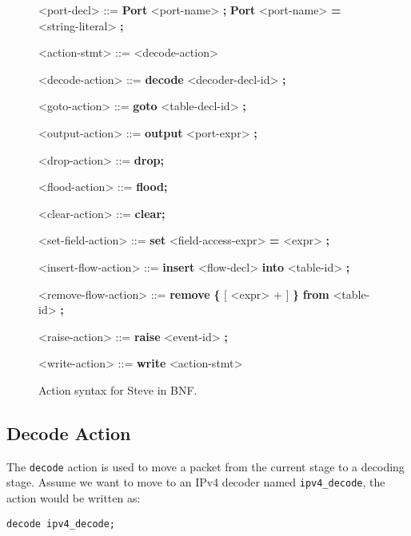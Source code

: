 \begin{figure}
\begin{mdframed}
\begin{grammar}
<port-decl> ::=
\textbf{Port} <port-name> \textbf{;}
\alt \textbf{Port} <port-name> \textbf{=} <string-literal> \textbf{;}

<action-stmt> ::=
<decode-action>

<decode-action> ::=
\textbf{decode} <decoder-decl-id> \textbf{;}

<goto-action> ::=
\textbf{goto} <table-decl-id> \textbf{;}

<output-action> ::=
\textbf{output} <port-expr> \textbf{;}

<drop-action> ::= \textbf{drop;}

<flood-action> ::= \textbf{flood;}

<clear-action> ::= \textbf{clear;}

<set-field-action> ::= \textbf{set} <field-access-expr> \textbf{=} <expr> \textbf{;}

<insert-flow-action> ::= \textbf{insert} <flow-decl> \textbf{into} <table-id> \textbf{;}

<remove-flow-action> ::= \textbf{remove} \textbf{\{} [ <expr> + ] \textbf{\}}
\textbf{from} <table-id> \textbf{;}

<raise-action> ::= \textbf{raise} <event-id> \textbf{;}

<write-action> ::= \textbf{write} <action-stmt>

\end{grammar}
\end{mdframed}
\caption{Action syntax for Steve in BNF.}
\label{fg:action_syntax}
\end{figure}

\subsection{Decode Action} \label{tut:decode_action}

The \texttt{decode} action is used to move a packet from the current stage to a decoding stage. Assume we want to move to an IPv4 decoder named \texttt{ipv4\_decode}, the action would be written as:

\begin{lstlisting}
decode ipv4_decode;
\end{lstlisting}

